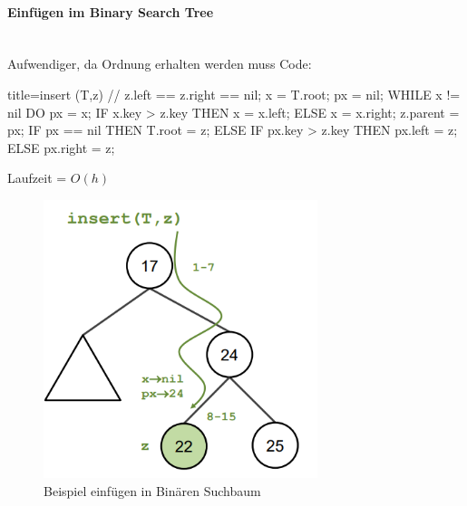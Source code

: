 \documentclass[
    ngerman,
    color=3b,
    load_common, %
    summary,
    boxarc,
]{tuda_summary}
\begin{document}
\paragraph{Einfügen im Binary Search Tree}\mbox{}\\
Aufwendiger, da Ordnung erhalten werden muss
Code:\label{BST-Insert}
\begin{codeBlock}[autogobble]{title={insert (T,z) // z.left == z.right == nil;}}
    x = T.root;
    px = nil;
    WHILE x != nil DO
      px = x;
      IF x.key > z.key THEN
          x = x.left;
      ELSE
          x = x.right;
    z.parent = px;
    IF px == nil THEN
      T.root = z;
    ELSE
      IF px.key > z.key THEN
          px.left = z;
      ELSE
          px.right = z;
\end{codeBlock}
Laufzeit = $O(h)$
\begin{figure}[h]
    \centering
    \includegraphics[width=8cm]{pictures/binärerSuchbaumEinfügen.PNG}
    \caption{Beispiel einfügen in Binären Suchbaum}
\end{figure}

\clearpage
\end{document}
